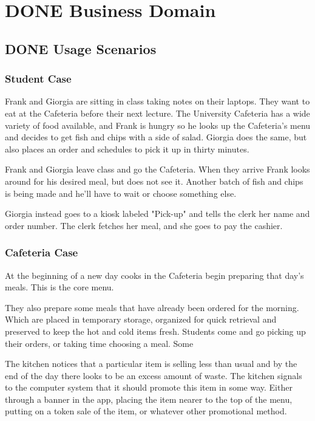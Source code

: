 \documentclass[11pt]{article}
\begin{document}
\section{{\bfseries\sffamily DONE} Business Domain}
\label{sec:org5aaf122}
\subsection{{\bfseries\sffamily DONE} Usage Scenarios}
\label{sec:org2bae437}
\subsubsection{Student Case}
\label{sec:orge7ad901}
Frank and Giorgia are sitting in class taking notes on their
laptops. They want to eat at the Cafeteria before their next
lecture. The University Cafeteria has a wide variety of food
available, and Frank is hungry so he looks up the Cafeteria's menu
and decides to get fish and chips with a side of salad. Giorgia
does the same, but also places an order and schedules to pick it
up in thirty minutes.

Frank and Giorgia leave class and go the Cafeteria. When they
arrive Frank looks around for his desired meal, but does not see
it. Another batch of fish and chips is being made and he'll have
to wait or choose something else. 

Giorgia instead goes to a kiosk labeled "Pick-up" and tells the
clerk her name and order number. The clerk fetches her meal, and
she goes to pay the cashier.
\subsubsection{Cafeteria Case}
\label{sec:orgfe3e655}
At the beginning of a new day cooks in the Cafeteria begin
preparing that day's meals. This is the core menu.

They also prepare some meals that have already been ordered for
the morning. Which are placed in temporary storage, organized for
quick retrieval and preserved to keep the hot and cold items
fresh. Students come and go picking up their orders, or taking
time choosing a meal. Some 

The kitchen notices that a particular item is selling less than
usual and by the end of the day there looks to be an excess amount
of waste. The kitchen signals to the computer system that it
should promote this item in some way. Either through a banner in
the app, placing the item nearer to the top of the menu, putting
on a token sale of the item, or whatever other promotional
method.
\end{document}
